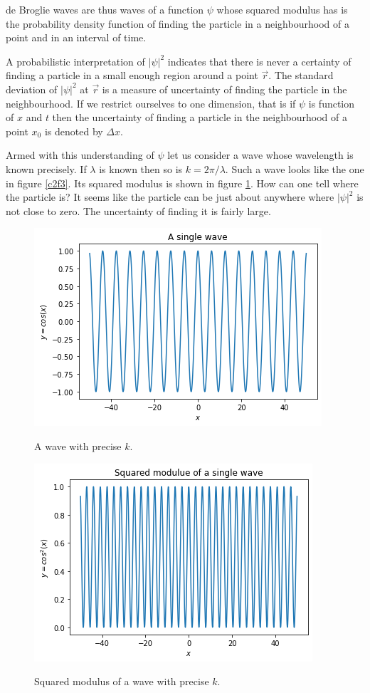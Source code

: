 de Broglie waves are thus waves of a function $\psi$ whose squared modulus has
is the probability density function of finding the particle in a neighbourhood
of a point and in an interval of time.

A probabilistic interpretation of $|\psi|^2$ indicates that there is never a 
certainty of finding a particle in a small enough region around a point 
$\vec{r}$. The standard deviation of $|\psi|^2$ at $\vec{r}$ is a measure of
uncertainty of finding the particle in the neighbourhood. If we restrict 
ourselves to one dimension, that is if $\psi$ is function of $x$ and $t$ then
the uncertainty of finding a particle in the neighbourhood of a point $x_0$ is
denoted by $\Delta x$. 

Armed with this understanding of $\psi$ let us consider a wave whose wavelength
is known precisely. If $\lambda$ is known then so is $k = 2\pi/\lambda$. Such
a wave looks like the one in figure \ref{c2f3}. Its squared modulus is shown in
figure \ref{c2f4}. How can one tell where the particle is? It seems like the
particle can be just about anywhere where $|\psi|^2$ is not close to zero. The
uncertainty of finding it is fairly large.
\begin{figure}
\begin{center}
\includegraphics[scale=0.5]{one-wave}
\caption{A wave with precise $k$.}\label{c2f3}
\includegraphics[scale=0.5]{one-wave-sq}
\caption{Squared modulus of a wave with precise $k$.}\label{c2f4}
\end{center}
\end{figure}
